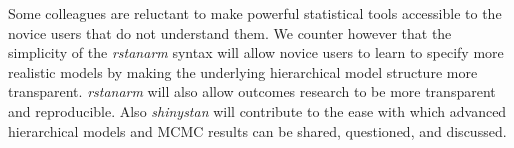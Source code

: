 \documentclass[11pt,notitlepage]{article}
\begin{document}
Some colleagues are reluctant to make powerful statistical tools accessible to the novice users that do not understand them. We counter 
however that the simplicity of the \textit{rstanarm} syntax will allow novice users to learn to specify more realistic models by 
making the underlying hierarchical model structure more transparent.  \textit{rstanarm} will also allow outcomes research to be 
more transparent and reproducible. Also \textit{shinystan} will contribute to the ease with which advanced hierarchical models and MCMC 
results can be shared, questioned, and discussed.
 

\newpage


\end{document}
